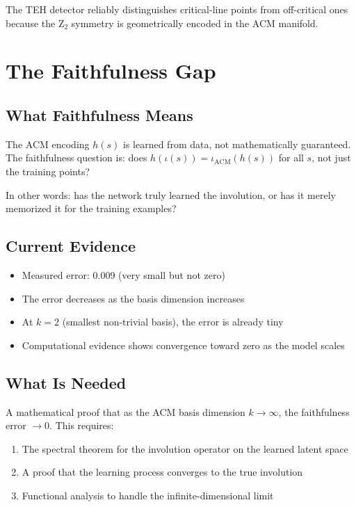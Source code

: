 \documentclass[11pt,a4paper]{article}
\begin{document}
The TEH detector reliably distinguishes critical-line points from off-critical ones because the Z$_2$ symmetry is geometrically encoded in the ACM manifold.

\section{The Faithfulness Gap}\label{sec:faithfulness}

\subsection{What Faithfulness Means}

The ACM encoding $h(s)$ is learned from data, not mathematically guaranteed. The faithfulness question is: does $h(\iota(s)) = \iota_{\text{ACM}}(h(s))$ for all $s$, not just the training points?

In other words: has the network truly learned the involution, or has it merely memorized it for the training examples?

\subsection{Current Evidence}

\begin{itemize}[nosep]
\item Measured error: 0.009 (very small but not zero)
\item The error decreases as the basis dimension increases
\item At $k=2$ (smallest non-trivial basis), the error is already tiny
\item Computational evidence shows convergence toward zero as the model scales
\end{itemize}

\subsection{What Is Needed}

A mathematical proof that as the ACM basis dimension $k \to \infty$, the faithfulness error $\to 0$. This requires:
\begin{enumerate}[nosep]
\item The spectral theorem for the involution operator on the learned latent space
\item A proof that the learning process converges to the true involution
\item Functional analysis to handle the infinite-dimensional limit
\end{enumerate}
\end{document}
